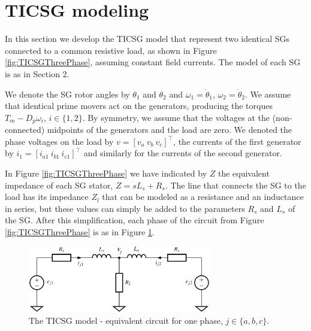 \documentclass[letterpaper, 10 pt, conference]{ieeeconf}
\renewcommand{\o}    {{\omega}}
\begin{document}
\section{TICSG modeling}

In this section we develop the TICSG model that represent two 
identical SGs connected to a common resistive load, as shown in
Figure \ref{fig:TICSGThreePhase}, assuming constant field currents.
The model of each SG is as in Section 2.

We denote the SG rotor angles by $\theta_1$ and $\theta_2$ and
$\o_1=\dot\theta_1$, $\o_2=\dot\theta_2$. We assume that identical
prime movers act on the generators, producing the torques
$T_{m}-D_p\o_i$, $i\in\{1,2\}$. By symmetry, we assume that the
voltages at the (non-connected) midpoints of the generators and the
load are zero. We denoted the phase voltages on the load by
$v=\left[v_a\ v_b\ v_c \right]^\top$, the currents of the first
generator by $i_1=\left[i_{a1} \ i_{b1}\ i_{c1}\right]^\top$ and 
similarly for the currents of the second generator.

In Figure \ref{fig:TICSGThreePhase} we have indicated by $Z$ the
equivalent impedance of each SG stator, $Z=sL_s+R_s$. The line that
connects the SG to the load has its impedance $Z_l$ that can be
modeled as a resistance and an inductance in series, but these values
can simply be added to the parameters $R_s$ and $L_s$ of the SG. After
this simplification, each phase of the circuit from Figure
\ref{fig:TICSGThreePhase} is as in Figure \ref{fig:TICSGOnePhase}.

\begin{figure} %
\centering \includegraphics[width=8cm]{one_phase.eps}
\vspace{-3mm}
\caption{The TICSG model - equivalent circuit for one phase, 
$j\in\{a,b,c\}.$} \vspace{-6mm}
\label{fig:TICSGOnePhase}
\end{figure}
\end{document}
